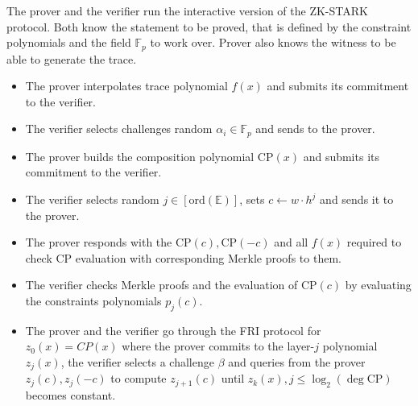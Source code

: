 \documentclass[../lecture-notes-148x210.tex]{subfiles}
\begin{document}
\begin{tcolorbox}[title=Interactive ZK-STARK protocol,
    colback=blue!5!white,
    colframe=blue!75!black,
    colbacktitle=blue!25!white,
    coltitle=blue!20!black,
    fonttitle=\bfseries,
    boxrule=1.25pt,
    subtitle style={boxrule=0pt,
    colback=blue!20!white,
    colupper=blue!75!gray} ]
    \small

    The prover and the verifier run the interactive version of the ZK-STARK
    protocol. Both know the statement to be proved, that is defined by the
    constraint polynomials and the field $\mathbb{F}_p$ to work over. Prover also
    knows the witness to be able to generate the trace.

    \begin{itemize}[label=]
        \item The prover interpolates trace polynomial $f(x)$ and submits its
        commitment to the verifier.
        \item The verifier selects challenges random $\alpha_i \in \mathbb{F}_p$ 
        and sends to the prover.
        \item The prover builds the composition polynomial $\text{CP}(x)$ and
        submits its commitment to the verifier.
    \end{itemize}

    \begin{itemize}[label=]
        \item The verifier selects random $j \in [\text{ord}(\mathbb{E})]$, sets
        $c \gets w\cdot h^j$ and sends it to the prover.
        \item The prover responds with the $\text{CP}(c), \text{CP}(-c)$ and all
        $f(x)$ required to check $\text{CP}$ evaluation with corresponding Merkle
        proofs to them.
        \item The verifier checks Merkle proofs and the evaluation of
        $\text{CP}(c)$ by evaluating the constraints polynomials $p_j(c)$.
        \item The prover and the verifier go through the FRI protocol for
        $z_0(x) = CP(x)$ where the prover commits to the layer-$j$ polynomial
        $z_j(x)$, the verifier selects a challenge $\beta$ and queries from the
        prover $z_j(c), z_j(-c)$ to compute $z_{j+1}(c)$ until $z_k(x), j \leq
        \log_2(\deg \text{CP})$ becomes constant.
    \end{itemize}
    
\end{tcolorbox}
\end{document}
